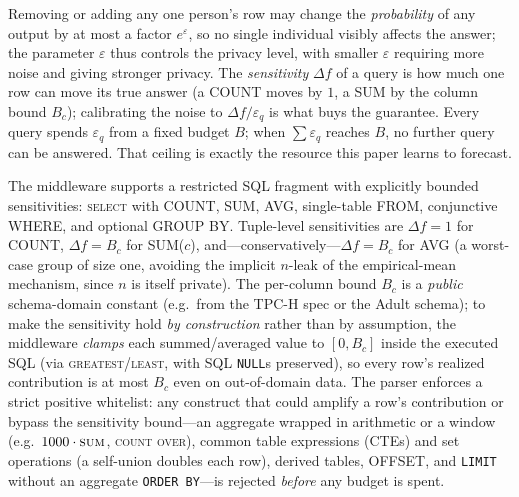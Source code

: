 \documentclass[sigconf,nonacm]{acmart}
\newcommand{\eps}{\varepsilon}
\begin{document}
\noindent Removing or adding any one person's row may change the \emph{probability} of any output by at most a factor $e^\eps$, so no single individual visibly affects the answer; the parameter $\eps$ thus controls the privacy level, with smaller $\eps$ requiring more noise and giving stronger privacy. The \emph{sensitivity} $\Delta f$ of a query is how much one row can move its true answer (a COUNT moves by $1$, a SUM by the column bound $B_c$); calibrating the noise to $\Delta f/\eps_q$ is what buys the guarantee. Every query spends $\eps_q$ from a fixed budget $B$; when $\sum\eps_q$ reaches $B$, no further query can be answered. That ceiling is exactly the resource this paper learns to forecast.

The middleware supports a restricted SQL fragment with explicitly bounded sensitivities: \textsc{select} with COUNT, SUM, AVG, single-table FROM, conjunctive WHERE, and optional GROUP BY. Tuple-level sensitivities are $\Delta f=1$ for COUNT, $\Delta f=B_c$ for SUM($c$), and---conservatively---$\Delta f=B_c$ for AVG (a worst-case group of size one, avoiding the implicit $n$-leak of the empirical-mean mechanism, since $n$ is itself private). The per-column bound $B_c$ is a \emph{public} schema-domain constant (e.g.\ from the TPC-H spec or the Adult schema); to make the sensitivity hold \emph{by construction} rather than by assumption, the middleware \emph{clamps} each summed/averaged value to $[0,B_c]$ inside the executed SQL (via \textsc{greatest}/\textsc{least}, with SQL \texttt{NULL}s preserved), so every row's realized contribution is at most $B_c$ even on out-of-domain data. The parser enforces a strict positive whitelist: any construct that could amplify a row's contribution or bypass the sensitivity bound---an aggregate wrapped in arithmetic or a window (e.g.\ $1000\cdot\textsc{sum}$, \textsc{count} \textsc{over}), common table expressions (CTEs) and set operations (a self-union doubles each row), derived tables, OFFSET, and \texttt{LIMIT} without an aggregate \texttt{ORDER BY}---is rejected \emph{before} any budget is spent.
\end{document}
